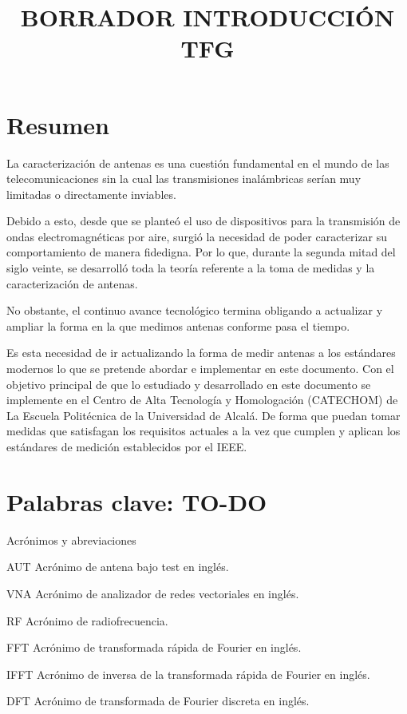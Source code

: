 \documentclass{article}
\begin{document}
\title{BORRADOR INTRODUCCIÓN TFG}

\tableofcontents
\newpage

\section{Resumen}

La caracterización de antenas es una cuestión fundamental en el mundo de las telecomunicaciones sin la cual las transmisiones inalámbricas serían muy limitadas o directamente inviables. 

Debido a esto, desde que se planteó el uso de dispositivos para la transmisión de ondas electromagnéticas por aire, surgió la necesidad de poder caracterizar su comportamiento de manera fidedigna. Por lo que, durante la segunda mitad del siglo veinte, se desarrolló toda la teoría referente a la toma de medidas y la caracterización de antenas. 

No obstante, el continuo avance tecnológico termina obligando a actualizar y ampliar la forma en la que medimos antenas conforme pasa el tiempo.

Es esta necesidad de ir actualizando la forma de medir antenas a los estándares modernos lo que se pretende abordar e implementar en este documento. Con el objetivo principal de que lo estudiado y desarrollado en este documento se implemente en el Centro de Alta Tecnología y Homologación (CATECHOM) de La Escuela Politécnica de la Universidad de Alcalá. De forma que puedan tomar medidas que satisfagan los requisitos actuales a la vez que cumplen y aplican los estándares de medición establecidos por el IEEE. 

\newpage

\section{Palabras clave: TO-DO} 

Acrónimos y abreviaciones 

AUT Acrónimo de antena bajo test en inglés. 

VNA Acrónimo de analizador de redes vectoriales en inglés. 

RF Acrónimo de radiofrecuencia.

FFT Acrónimo de transformada rápida de Fourier en inglés.

IFFT Acrónimo de inversa de la transformada rápida de Fourier en inglés.

DFT Acrónimo de transformada de Fourier discreta en inglés.
\end{document}
